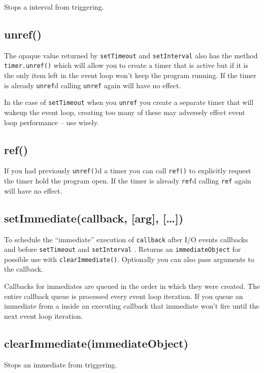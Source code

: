 Stops a interval from triggering.

\subsection{unref()}\label{unref}

The opaque value returned by \texttt{setTimeout} and
\texttt{setInterval} also has the method \texttt{timer.unref()} which
will allow you to create a timer that is active but if it is the only
item left in the event loop won't keep the program running. If the timer
is already \texttt{unref}d calling \texttt{unref} again will have no
effect.

In the case of \texttt{setTimeout} when you \texttt{unref} you create a
separate timer that will wakeup the event loop, creating too many of
these may adversely effect event loop performance -- use wisely.

\subsection{ref()}\label{ref}

If you had previously \texttt{unref()}d a timer you can call
\texttt{ref()} to explicitly request the timer hold the program open. If
the timer is already \texttt{ref}d calling \texttt{ref} again will have
no effect.

\subsection{setImmediate(callback, {[}arg{]},
{[}\ldots{}{]})}\label{setimmediatecallback-arg}

To schedule the ``immediate'' execution of \texttt{callback} after I/O
events callbacks and before \texttt{setTimeout} and \texttt{setInterval}
. Returns an \texttt{immediateObject} for possible use with
\texttt{clearImmediate()}. Optionally you can also pass arguments to the
callback.

Callbacks for immediates are queued in the order in which they were
created. The entire callback queue is processed every event loop
iteration. If you queue an immediate from a inside an executing callback
that immediate won't fire until the next event loop iteration.

\subsection{clearImmediate(immediateObject)}\label{clearimmediateimmediateobject}

Stops an immediate from triggering.
